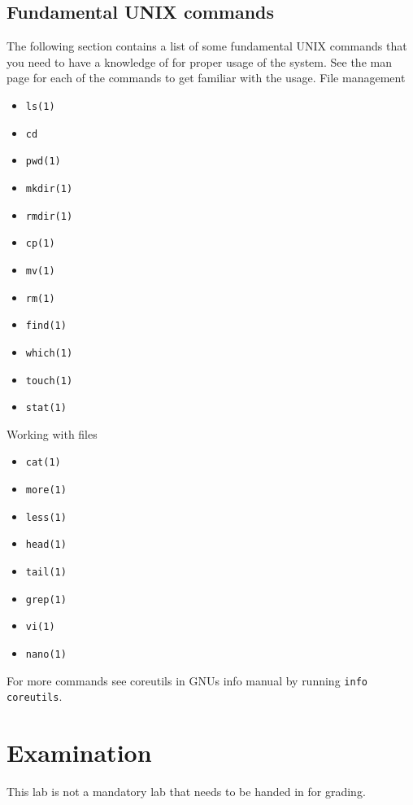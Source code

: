 \documentclass[a4paper]{miunasgn}
\begin{document}
\subsection{Fundamental UNIX commands}
The following section contains a list of some fundamental UNIX commands that you
need to have a knowledge of for proper usage of the system. See the man page for
each of the commands to get familiar with the usage.
File management
\begin{itemize}
  \item \texttt{ls(1)}
  \item \texttt{cd}
  \item \texttt{pwd(1)}
  \item \texttt{mkdir(1)}
  \item \texttt{rmdir(1)}
  \item \texttt{cp(1)}
  \item \texttt{mv(1)}
  \item \texttt{rm(1)}
  \item \texttt{find(1)}
  \item \texttt{which(1)}
  \item \texttt{touch(1)}
  \item \texttt{stat(1)}
\end{itemize}

Working with files
\begin{itemize}
  \item \texttt{cat(1)}
  \item \texttt{more(1)}
  \item \texttt{less(1)}
  \item \texttt{head(1)}
  \item \texttt{tail(1)}
  \item \texttt{grep(1)}
  \item \texttt{vi(1)}
  \item \texttt{nano(1)}
\end{itemize}

For more commands see coreutils in GNUs info manual by running 
\texttt{info coreutils}.
\section{Examination}
\label{sec:exam}
This lab is not a mandatory lab that needs to be handed in for grading.


\printbibliography
\end{document}
